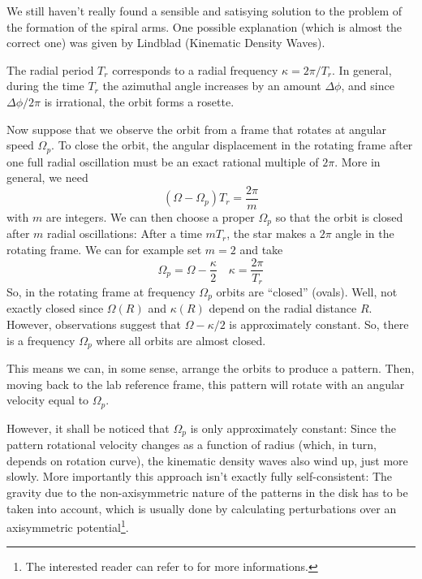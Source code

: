 We still haven't really found a sensible and satisying solution to the problem of the formation of the spiral arms. One possible explanation (which is almost the correct one) was given by Lindblad (Kinematic Density Waves).
\par The radial period $T_{r}$ corresponds to a radial frequency $\kappa = 2\pi/T_{r}$. In general, during the time $T_{r}$ the azimuthal angle increases by an amount $\Delta\phi$, and since $\Delta\phi/2\pi$ is irrational, the orbit forms a rosette.
\par Now suppose that we observe the orbit from a frame that rotates at angular speed $\Omega_{p}$. To close the orbit, the angular displacement in the rotating frame after one full radial oscillation must be an exact rational multiple of $2\pi$. More in general, we need
\begin{equation*}
    (\Omega-\Omega_{p})T_{r} = \frac{2\pi}{m}
\end{equation*}
with $m$ are integers. We can then choose a proper $\Omega_{p}$ so that the orbit is closed after $m$ radial oscillations: After a time $mT_{r}$, the star makes a $2\pi$ angle in the rotating frame. We can for example set $m=2$ and take 
\begin{equation*}
    \Omega_{p} = \Omega -\frac{\kappa}{2} \quad \kappa = \frac{2\pi}{T_{r}}
\end{equation*}
So, in the rotating frame at frequency $\Omega_{p}$ orbits are “closed” (ovals). Well, not exactly closed since $\Omega(R)$ and $\kappa(R)$ depend on the radial distance $R$. However, observations suggest that $\Omega - \kappa/2$ is approximately constant. So, there is a frequency $\Omega_{p}$ where all orbits are almost closed.
\par This means we can, in some sense, arrange the orbits to produce a pattern. Then, moving back to the lab reference frame, this pattern will rotate with an angular velocity equal to $\Omega_{p}$.
\par However, it shall be noticed that $\Omega_{p}$ is only approximately constant: Since the pattern rotational velocity changes as a function of radius (which, in turn, depends on rotation curve), the kinematic density waves also wind up, just more slowly. More importantly this approach isn't exactly fully self-consistent: The gravity due to the non-axisymmetric nature of the patterns in the disk has to be taken into account, which is usually done by calculating perturbations over an axisymmetric potential\footnote{The interested reader can refer to \cite{1964ApJ...140..646L} for more informations.}.

